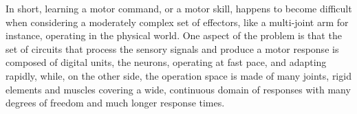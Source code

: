 \documentclass[runningheads]{llncs}
\begin{document}

%	

In short, learning a motor command, or a motor skill, happens to become difficult when considering a moderately complex set of effectors, like a multi-joint arm for instance, operating in the physical world. One aspect of the problem is that the set of circuits that process the sensory signals and produce a motor response is composed of digital units, the neurons, operating at fast pace, and adapting rapidly, while, on the other side, the operation space is made of many joints, rigid elements and muscles covering a wide, continuous domain of responses with many degrees of freedom and much longer response times. 
\end{document}
